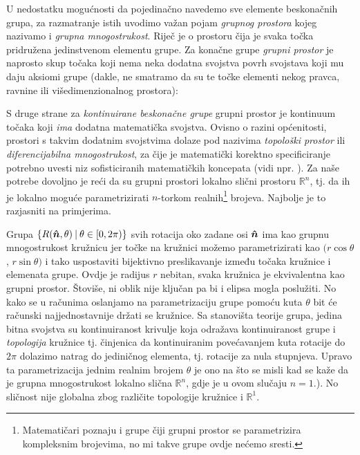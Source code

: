 U nedostatku mogućnosti da pojedinačno navedemo sve elemente beskonačnih
grupa, za razmatranje istih uvodimo važan pojam \emph{grupnog prostora}
kojeg nazivamo i \emph{grupna mnogostrukost}.
Riječ je o prostoru čija je svaka točka pridružena jedinstvenom
elementu grupe.
Za konačne grupe \emph{grupni prostor} je naprosto skup točaka koji
nema neka dodatna svojstva povrh svojstava koji mu daju aksiomi grupe
(dakle, ne smatramo da su te točke elementi nekog pravca, ravnine
ili višedimenzionalnog prostora):

\centerline{}

S druge strane za \emph{kontinuirane beskonačne grupe} grupni prostor je
kontinuum točaka koji \emph{ima} dodatna matematička svojstva. 
Ovisno o razini općenitosti, prostori s takvim dodatnim svojstvima dolaze pod
nazivima \emph{topološki prostor} ili \emph{diferencijabilna mnogostrukost},
za čije je matematički korektno specificiranje potrebno uvesti
niz sofisticiranih matematičkih koncepata (vidi npr. 
\cite{Smolic:2024}). Za naše potrebe dovoljno je reći da su grupni
prostori lokalno slični prostoru $\mathbb{R}^n$,
tj. da ih je lokalno moguće parametrizirati $n$-torkom realnih\footnote{Matematičari
    poznaju i grupe čiji grupni prostor se parametrizira kompleksnim
    brojevima, no mi takve grupe ovdje nećemo sresti.}
brojeva. Najbolje je to razjasniti na primjerima.


Grupa $\{R(\unitn, \theta) \td \theta\in[0,2\pi)\}$ svih rotacija oko zadane osi
$\unitn$ ima kao grupnu mnogostrukost kružnicu jer točke na kružnici možemo parametrizirati
kao $(r\cos\theta$, $r\sin\theta)$ i tako uspostaviti bijektivno preslikavanje
između točaka kružnice i elemenata grupe. 
Ovdje je radijus $r$ nebitan, svaka kružnica je ekvivalentna kao
grupni prostor. Štoviše, ni oblik nije ključan pa bi i elipsa mogla poslužiti.
No kako se u računima oslanjamo na parametrizaciju grupe pomoću
kuta $\theta$ bit će računski najjednostavnije držati se kružnice.
Sa stanovišta teorije grupa, jedina bitna svojstva su kontinuiranost krivulje
koja odražava kontinuiranost grupe i \emph{topologija} kružnice tj. činjenica da 
kontinuiranim povećavanjem kuta rotacije do $2\pi$ dolazimo natrag do jediničnog
elementa, tj. rotacije za nula stupnjeva.
Upravo ta parametrizacija jednim realnim brojem $\theta$ je ono na što
se misli kad se kaže da je grupna mnogostrukost lokalno slična $\mathbb{R}^n$,
gdje je u ovom slučaju $n=1$.).
No sličnost nije globalna zbog različite topologije kružnice
i $\mathbb{R}^1$.

